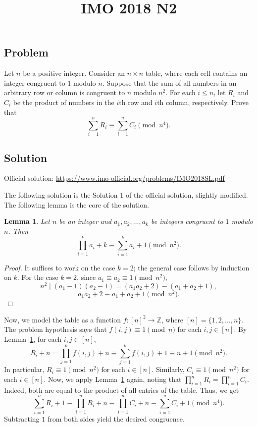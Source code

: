 \documentclass{article}
\title{IMO 2018 N2}
\author{}
\date{}
\newcommand{\Z}{\mathbb{Z}}
\newtheorem{lemma}{Lemma}
\begin{document}
\maketitle



\subsection*{Problem}

Let $n$ be a positive integer.
Consider an $n \times n$ table, where each cell contains an integer congruent to $1$ modulo $n$.
Suppose that the sum of all numbers in an arbitrary row or column is congruent to $n$ modulo $n^2$.
For each $i \leq n$, let $R_i$ and $C_i$ be the product of numbers in the $i$th row and $i$th column, respectively.
Prove that
\[ \sum_{i = 1}^n R_i \equiv \sum_{i = 1}^n C_i \pmod{n^4}. \]



\subsection*{Solution}

Official solution: \url{https://www.imo-official.org/problems/IMO2018SL.pdf}

The following solution is the Solution 1 of the official solution, slightly modified.
The following lemma is the core of the solution.

\begin{lemma}\label{2018n2-1}
Let $n$ be an integer and $a_1, a_2, \ldots, a_k$ be integers congruent to $1$ modulo $n$.
Then \[ \prod_{i = 1}^k a_i + k \equiv \sum_{i = 1}^k a_i + 1 \pmod{n^2}. \]
\end{lemma}
\begin{proof}
It suffices to work on the case $k = 2$; the general case follows by induction on $k$.
For the case $k = 2$, since $a_1 \equiv a_2 \equiv 1 \pmod{n^2}$,
\[ n^2 \mid (a_1 - 1)(a_2 - 1) = (a_1 a_2 + 2) - (a_1 + a_2 + 1), \]
\[ a_1 a_2 + 2 \equiv a_1 + a_2 + 1 \pmod{n^2}. \]
\end{proof}

Now, we model the table as a function $f : [n]^2 \to \Z$, where $[n] = \{1, 2, \ldots, n\}$.
The problem hypothesis says that $f(i, j) \equiv 1 \pmod{n}$ for each $i, j \in [n]$.
By Lemma~\ref{2018n2-1}, for each $i, j \in [n]$,
\[ R_i + n = \prod_{j = 1}^k f(i, j) + n \equiv \sum_{j = 1}^k f(i, j) + 1 \equiv n + 1 \pmod{n^2}. \]
In particular, $R_i \equiv 1 \pmod{n^2}$ for each $i \in [n]$.
Similarly, $C_i \equiv 1 \pmod{n^2}$ for each $i \in [n]$.
Now, we apply Lemma~\ref{2018n2-1} again, noting that $\displaystyle \prod_{i = 1}^n R_i = \prod_{i = 1}^n C_i$.
Indeed, both are equal to the product of all entries of the table.
Thus, we get
\[ \sum_{i = 1}^n R_i + 1 \equiv \prod_{i = 1}^n R_i + n \equiv \prod_{i = 1}^n C_i + n \equiv \sum_{i = 1}^n C_i + 1 \pmod{n^4}. \]
Subtracting $1$ from both sides yield the desired congruence.
\end{document}
